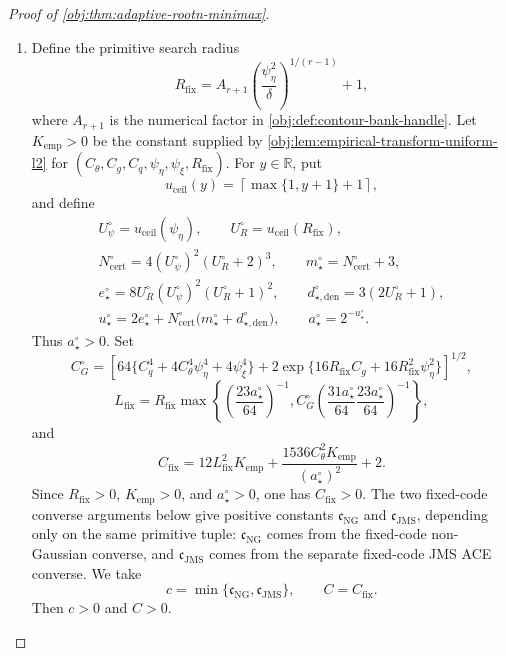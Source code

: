 \documentclass[11pt]{article}
\begin{document}
\begin{proof}[Proof of \cref{obj:thm:adaptive-rootn-minimax}]
\begin{enumerate}
\item Define the primitive search radius
\[
R_{\mathrm{fix}}
=
A_{r+1}\left(\frac{\psi_{\eta}^{2}}{\delta}\right)^{1/(r-1)}+1,
\]
where \(A_{r+1}\) is the numerical factor in \cref{obj:def:contour-bank-handle}.  Let \(K_{\mathrm{emp}}>0\) be the constant supplied by \cref{obj:lem:empirical-transform-uniform-l2} for
\((C_{\theta},C_g,C_q,\psi_{\eta},\psi_{\xi},R_{\mathrm{fix}})\).  For \(y\in\mathbb R\), put
\[
u_{\mathrm{ceil}}(y)=\left\lceil \max\{1,y+1\}+1\right\rceil ,
\]
and define
\[
\begin{gathered}
U_{\psi}^{\circ}=u_{\mathrm{ceil}}(\psi_{\eta}),\qquad
U_R^{\circ}=u_{\mathrm{ceil}}(R_{\mathrm{fix}}),\\
N_{\mathrm{cert}}^{\circ}=4(U_{\psi}^{\circ})^2(U_R^{\circ}+2)^3,\qquad
m_{\star}^{\circ}=N_{\mathrm{cert}}^{\circ}+3,\\
e_{\star}^{\circ}=8U_R^{\circ}(U_{\psi}^{\circ})^2(U_R^{\circ}+1)^2,\qquad
d_{\star,\mathrm{den}}^{\circ}=3(2U_R^{\circ}+1),\\
u_{\star}^{\circ}=2e_{\star}^{\circ}
+N_{\mathrm{cert}}^{\circ}\bigl(m_{\star}^{\circ}+d_{\star,\mathrm{den}}^{\circ}\bigr),
\qquad
a_{\star}^{\circ}=2^{-u_{\star}^{\circ}}.
\end{gathered}
\]
Thus \(a_{\star}^{\circ}>0\).  Set
\[
C_G^{\circ}
=
\left[
64\{C_q^4+4C_{\theta}^4\psi_{\eta}^4+4\psi_{\xi}^4\}
+2\exp\{16R_{\mathrm{fix}}C_g+16R_{\mathrm{fix}}^2\psi_{\eta}^2\}
\right]^{1/2},
\]
\[
L_{\mathrm{fix}}
=
R_{\mathrm{fix}}
\max\left\{
\left(\frac{23a_{\star}^{\circ}}{64}\right)^{-1},
C_G^{\circ}
\left(\frac{31a_{\star}^{\circ}}{64}\frac{23a_{\star}^{\circ}}{64}\right)^{-1}
\right\},
\]
and
\[
C_{\mathrm{fix}}
=
12L_{\mathrm{fix}}^2K_{\mathrm{emp}}
+\frac{1536C_{\theta}^2K_{\mathrm{emp}}}{(a_{\star}^{\circ})^2}
+2.
\]
Since \(R_{\mathrm{fix}}>0\), \(K_{\mathrm{emp}}>0\), and \(a_{\star}^{\circ}>0\), one has \(C_{\mathrm{fix}}>0\).  The two fixed-code converse arguments below give positive constants \(\mathfrak c_{\mathrm{NG}}\) and \(\mathfrak c_{\mathrm{JMS}}\), depending only on the same primitive tuple: \(\mathfrak c_{\mathrm{NG}}\) comes from the fixed-code non-Gaussian converse, and \(\mathfrak c_{\mathrm{JMS}}\) comes from the separate fixed-code JMS ACE converse.  We take
\[
c=\min\{\mathfrak c_{\mathrm{NG}},\mathfrak c_{\mathrm{JMS}}\},
\qquad
C=C_{\mathrm{fix}}.
\]
Then \(c>0\) and \(C>0\). %


\end{enumerate}
\end{proof}
\end{document}
